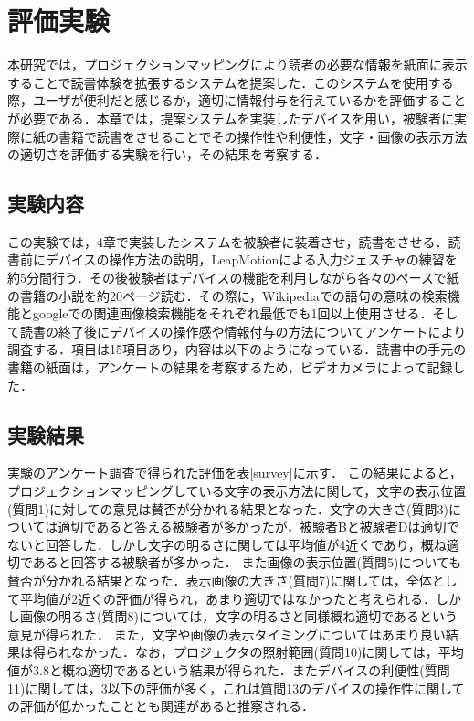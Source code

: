 \section{評価実験}

本研究では，プロジェクションマッピングにより読者の必要な情報を紙面に表示することで読書体験を拡張するシステムを提案した．このシステムを使用する際，ユーザが便利だと感じるか，適切に情報付与を行えているかを評価することが必要である．本章では，提案システムを実装したデバイスを用い，被験者に実際に紙の書籍で読書をさせることでその操作性や利便性，文字・画像の表示方法の適切さを評価する実験を行い，その結果を考察する．

\subsection{実験内容}

この実験では，4章で実装したシステムを被験者に装着させ，読書をさせる．読書前にデバイスの操作方法の説明，LeapMotionによる入力ジェスチャの練習を約5分間行う．その後被験者はデバイスの機能を利用しながら各々のペースで紙の書籍の小説を約20ページ読む．その際に，Wikipediaでの語句の意味の検索機能とgoogleでの関連画像検索機能をそれぞれ最低でも1回以上使用させる．そして読書の終了後にデバイスの操作感や情報付与の方法についてアンケートにより調査する．項目は15項目あり，内容は以下のようになっている．読書中の手元の書籍の紙面は，アンケートの結果を考察するため，ビデオカメラによって記録した．

\subsection{実験結果}

実験のアンケート調査で得られた評価を表\ref{survey}に示す．
この結果によると，プロジェクションマッピングしている文字の表示方法に関して，文字の表示位置(質問1)に対しての意見は賛否が分かれる結果となった．文字の大きさ(質問3)については適切であると答える被験者が多かったが，被験者Bと被験者Dは適切でないと回答した．しかし文字の明るさに関しては平均値が4近くであり，概ね適切であると回答する被験者が多かった．
また画像の表示位置(質問5)についても賛否が分かれる結果となった．表示画像の大きさ(質問7)に関しては，全体として平均値が2近くの評価が得られ，あまり適切ではなかったと考えられる．しかし画像の明るさ(質問8)については，文字の明るさと同様概ね適切であるという意見が得られた．
また，文字や画像の表示タイミングについてはあまり良い結果は得られなかった．なお，プロジェクタの照射範囲(質問10)に関しては，平均値が3.8と概ね適切であるという結果が得られた．またデバイスの利便性(質問11)に関しては，3以下の評価が多く，これは質問13のデバイスの操作性に関しての評価が低かったこととも関連があると推察される．


